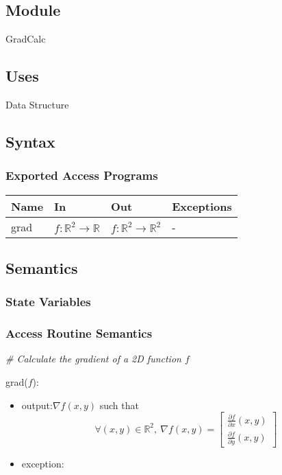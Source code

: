 \documentclass[12pt, titlepage]{article}
\begin{document}
\subsection{Module}
GradCalc
\subsection{Uses}
Data Structure
\subsection{Syntax}

\subsubsection{Exported Access Programs}
\begin{center}
\begin{tabular}{p{2cm} p{4cm} p{4cm} p{2cm}}
\hline
\textbf{Name} & \textbf{In} & \textbf{Out} & \textbf{Exceptions} \\
\hline
grad & $f:\mathbb{R}^2\rightarrow\mathbb{R}$  & $f:\mathbb{R}^2\rightarrow\mathbb{R}^2$ & -\\
\hline
\end{tabular}
\end{center}

\subsection{Semantics}

\subsubsection{State Variables}


\subsubsection{Access Routine Semantics}

\noindent\textit{{\#} Calculate the gradient of a 2D function $f$} \medskip

\noindent grad($f$):
\begin{itemize} 
\item output:$ \nabla f(x,y)$ such that
\begin{equation*}
\forall (x,y) \in \mathbb{R}^2, \ \nabla f(x,y) = \begin{bmatrix}
\frac{\partial f}{\partial x}(x,y) \\
\frac{\partial f}{\partial y}(x,y)
\end{bmatrix}
\end{equation*}
\item exception:  
\end{itemize}
\end{document}
